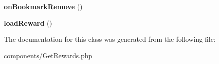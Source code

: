 \begin{DoxyCompactItemize}
\item 
\hypertarget{classDMA_1_1Friends_1_1Components_1_1GetRewards_abcebcc3ca8b1d322c1ce12f4421dd564}{{\bfseries on\+Bookmark\+Remove} ()}\label{classDMA_1_1Friends_1_1Components_1_1GetRewards_abcebcc3ca8b1d322c1ce12f4421dd564}

\item 
\hypertarget{classDMA_1_1Friends_1_1Components_1_1GetRewards_a09c848db3172c50fd381728649c85e02}{{\bfseries load\+Reward} ()}\label{classDMA_1_1Friends_1_1Components_1_1GetRewards_a09c848db3172c50fd381728649c85e02}

\end{DoxyCompactItemize}


The documentation for this class was generated from the following file\+:\begin{DoxyCompactItemize}
\item 
components/Get\+Rewards.\+php\end{DoxyCompactItemize}
